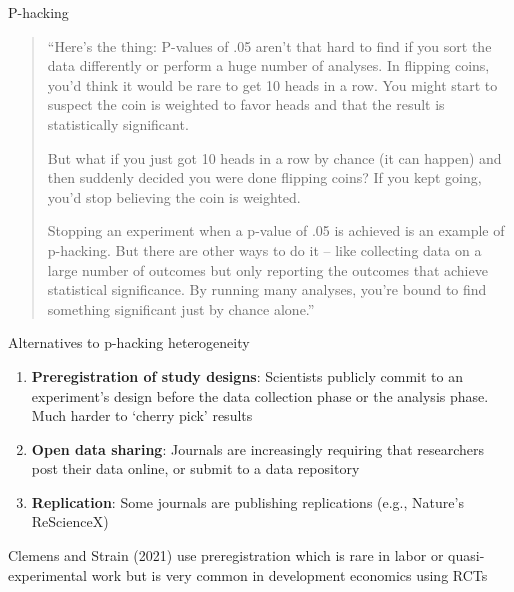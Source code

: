\documentclass{beamer}
\begin{document}
\begin{frame}{P-hacking}

\footnotesize
\begin{quote}
``Here's the thing: P-values of .05 aren't that hard to find if you sort the data differently or perform a huge number of analyses. In flipping coins, you'd think it would be rare to get 10 heads in a row. You might start to suspect the coin is weighted to favor heads and that the result is statistically significant.

\bigskip

But what if you just got 10 heads in a row by chance (it can happen) and then suddenly decided you were done flipping coins? If you kept going, you'd stop believing the coin is weighted.

\bigskip

Stopping an experiment when a p-value of .05 is achieved is an example of p-hacking. But there are other ways to do it -- like collecting data on a large number of outcomes but only reporting the outcomes that achieve statistical significance. By running many analyses, you're bound to find something significant just by chance alone.''

\end{quote}

\end{frame}


\begin{frame}{Alternatives to p-hacking heterogeneity}

\begin{enumerate}
\item \textbf{Preregistration of study designs}: Scientists publicly commit to an experiment's design before the data collection phase or the analysis phase. Much harder to `cherry pick' results
\item \textbf{Open data sharing}: Journals are increasingly requiring that researchers post their data online, or submit to a data repository
\item \textbf{Replication}: Some journals are publishing replications (e.g., Nature's ReScienceX)
\end{enumerate}

\bigskip

Clemens and Strain (2021) use preregistration which is rare in labor or quasi-experimental work but is very common in development economics using RCTs 

\end{frame}
\end{document}
